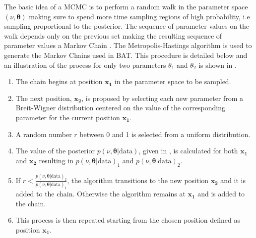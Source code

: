 The basic idea of a MCMC is to perform a random walk in the parameter space
$(\nu,\boldsymbol{\theta})$ making sure to spend more time sampling regions of
high probability, i.e sampling proportional to the posterior.  The sequence of
parameter values on the walk depends only on the previous set making the
resulting sequence of parameter values a Markov Chain \cite{Markov2006}.  The
Metropolis-Hastings algorithm \cite{10.2307/2334940,Beresford:2642397} is used
to generate the Markov Chains used in BAT.  This procedure is detailed below
and an illustration of the process for only two parameters $\theta_{1}$ and
$\theta_{2}$ is shown in .
%
\begin{enumerate}
\item The chain begins at position $\boldsymbol{x_{1}}$ in the parameter space to be sampled.
\item The next position, $\boldsymbol{x_{2}}$, is proposed by selecting each new parameter from a Breit-Wigner distribution centered on the value of the corresponding parameter for the current position $\boldsymbol{x_{1}}$.
\item A random number $r$ between 0 and 1 is selected from a uniform distribution.
\item The value of the posterior $p(\nu,\boldsymbol{\theta}|\text{data})$, given in , is calculated for both  $\boldsymbol{x_{1}}$ and  $\boldsymbol{x_{2}}$ resulting in $p(\nu,\boldsymbol{\theta}|\text{data})_{1}$ and $p(\nu,\boldsymbol{\theta}|\text{data})_{2}$.
\item If $r < \frac{p(\nu,\boldsymbol{\theta}|\text{data})_{2}}{p(\nu,\boldsymbol{\theta}|\text{data})_{1}}$, the algorithm transitions to the new position $\boldsymbol{x_{2}}$ and it is added to the chain. Otherwise the algorithm remains at $\boldsymbol{x_{1}}$ and is added to the chain.
\item This process is then repeated starting from the chosen position defined as position $\boldsymbol{x_{1}}$.
\end{enumerate}

